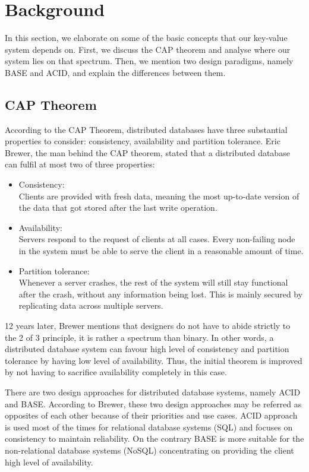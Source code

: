\section{Background}
\label{sec:background}
In this section, we elaborate on some of the basic concepts that our key-value system depends on. First, we discuss the CAP theorem and analyse where our system lies on that spectrum. Then, we mention two design paradigms, namely BASE and ACID, and explain the differences between them.

\subsection{CAP Theorem}
\label{sec:background_cap} 
According to the CAP Theorem, distributed databases have three substantial properties to consider: consistency, availability and partition tolerance\cite{brewer2012cap}. Eric Brewer, the man behind the CAP theorem, stated that a distributed database can fulfil at most two of three properties\cite{brewer2000cap}:

\begin{itemize}
  \item Consistency: \\
  Clients are provided with fresh data, meaning the most up-to-date version of the data that got stored after the last write operation.
  \item Availability: \\
  Servers respond to the request of clients at all cases. Every non-failing node in the system must be able to serve the client in a reasonable amount of time\cite{gilbert2002brewer}.
  \item Partition tolerance: \\
  Whenever a server crashes, the rest of the system will still stay functional after the crash, without any information being lost. This is mainly secured by replicating data across multiple servers.
\end{itemize}

12 years later, Brewer mentions that designers do not have to abide strictly to the 2 of 3 principle, it is rather a spectrum than binary\cite{brewer2012cap}. In other words, a distributed database system can favour high level of consistency and partition tolerance by having low level of availability. Thus, the initial theorem is improved by not having to sacrifice availability completely in this case.

There are two design approaches for distributed database systems, namely ACID and BASE. According to Brewer, these two design approaches may be referred as opposites of each other\cite{brewer2012cap} because of their priorities and use cases. ACID approach is used most of the times for relational database systems (SQL) and focuses on consistency to maintain reliability. On the contrary BASE is more suitable for the non-relational database systems (NoSQL) concentrating on providing the client high level of availability\cite{brewer2000cap}.

